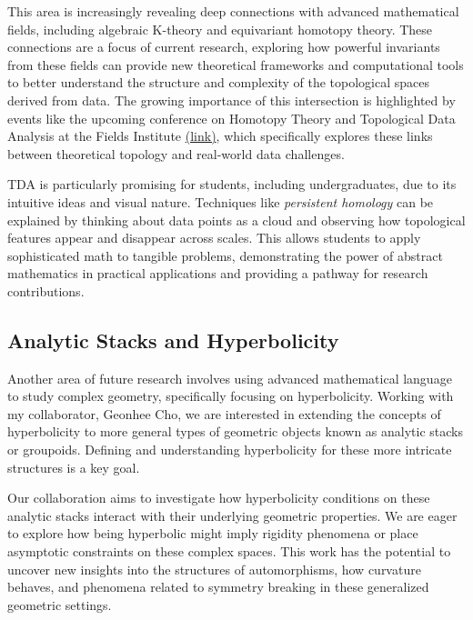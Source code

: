 \documentclass[11pt]{article}
\begin{document}
This area is increasingly revealing deep connections with advanced mathematical fields, including algebraic K-theory and equivariant homotopy theory. These connections are a focus of current research, exploring how powerful invariants from these fields can provide new theoretical frameworks and computational tools to better understand the structure and complexity of the topological spaces derived from data. The growing importance of this intersection is highlighted by events like the upcoming conference on Homotopy Theory and Topological Data Analysis at the Fields Institute \href{http://www.fields.utoronto.ca/activities/25-26/homotopy-theory}{(link)}, which specifically explores these links between theoretical topology and real-world data challenges.

TDA is particularly promising for students, including undergraduates, due to its intuitive ideas and visual nature. Techniques like {\it persistent homology} can be explained by thinking about data points as a cloud and observing how topological features appear and disappear across scales. This allows students to apply sophisticated math to tangible problems, demonstrating the power of abstract mathematics in practical applications and providing a pathway for research contributions.

\subsection*{Analytic Stacks and Hyperbolicity}
Another area of future research involves using advanced mathematical language to study complex geometry, specifically focusing on hyperbolicity.
Working with my collaborator, Geonhee Cho, we are interested in extending the concepts of hyperbolicity to more general types of geometric objects known as analytic stacks or groupoids. Defining and understanding hyperbolicity for these more intricate structures is a key goal.

Our collaboration aims to investigate how hyperbolicity conditions on these analytic stacks interact with their underlying geometric properties. We are eager to explore how being hyperbolic might imply rigidity phenomena or place asymptotic constraints on these complex spaces. This work has the potential to uncover new insights into the structures of  automorphisms, how curvature behaves, and phenomena related to symmetry breaking in these generalized geometric settings.
\end{document}
